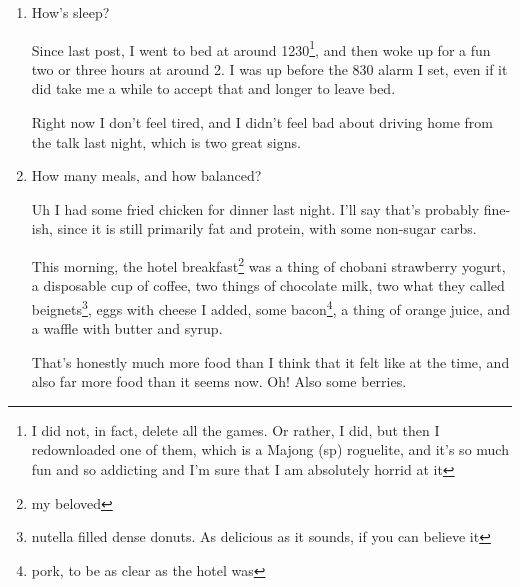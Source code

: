 \documentclass[12pt]{article}
\renewcommand{\,}{\textsuperscript{,}}
\begin{document}
\begin{enumerate}
I read a full book this morning which is just absolutely wild\footnote{oh, that could have been the folly for the day. Alas, I guess}  
Since being at the coffee shop, I've managed to get some journaling, a full hand-edit\footnote{read: I have a printed copy which I looked through and made changes as needed, including doing a bit of research because I had some hand waving that I didn't notice in a derivation} and about a third of the typed edits for the Introduction chapter.  
I got so burned out\footnote{burnt out? maybe just lost focus is the better term} at that point, and so now I'm going to do this until it's time for me to move my car.\footnote{my main reader expressed a preference for less polished folly writing, and so, at the very least, I'm going to try to have the daily reflection and draft 0/1 of things be so}

I assume that getting up and walking a bit will help.

\item How's sleep?

Since last post, I went to bed at around 1230\footnote{I did not, in fact, delete all the games. Or rather, I did, but then I redownloaded one of them, which is a Majong (sp) roguelite, and it's so much fun and so addicting and I'm sure that I am absolutely horrid at it}, and then woke up for a fun two or three hours at around 2.  
I was up before the 830 alarm I set, even if it did take me a while to accept that and longer to leave bed.

Right now I don't feel tired, and I didn't feel bad about driving home from the talk last night, which is two great signs.

\item How many meals, and how balanced?

Uh I had some fried chicken for dinner last night. I'll say that's probably fine-ish, since it is still primarily fat and protein, with some non-sugar carbs.

This morning, the hotel breakfast\footnote{my beloved} was a thing of chobani strawberry yogurt, a disposable cup of coffee, two things of chocolate milk, two what they called beignets\footnote{nutella filled dense donuts. As delicious as it sounds, if you can believe it}, eggs with cheese I added, some bacon\footnote{pork, to be as clear as the hotel was}, a thing of orange juice, and a waffle with butter and syrup.

That's honestly much more food than I think that it felt like at the time, and also far more food than it seems now.  
Oh! Also some berries.


\end{enumerate}
\end{document}
